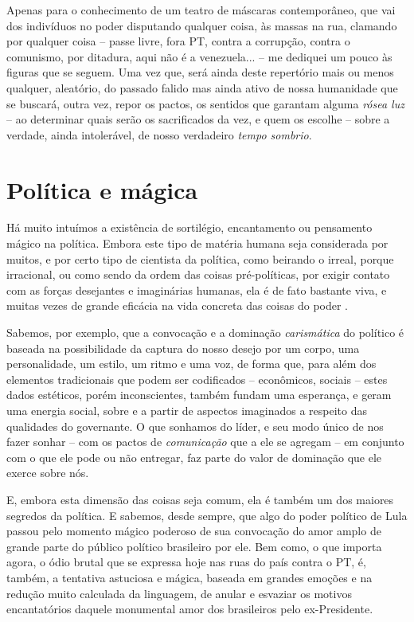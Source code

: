 Apenas para o conhecimento de um teatro de máscaras contemporâneo, que
vai dos indivíduos no poder disputando qualquer coisa, às massas na rua,
clamando por qualquer coisa -- passe livre, fora PT, contra a corrupção,
contra o comunismo, por ditadura, aqui não é a venezuela... -- me
dediquei um pouco às figuras que se seguem. Uma vez que, será ainda
deste repertório mais ou menos qualquer, aleatório, do passado falido
mas ainda ativo de nossa humanidade que se buscará, outra vez, repor os
pactos, os sentidos que garantam alguma \emph{rósea luz} -- ao
determinar quais serão os sacrificados da vez, e quem os escolhe --
sobre a verdade, ainda intolerável, de nosso verdadeiro \emph{tempo
sombrio}.

\chapter{Política e mágica}\label{poluxedtica-e-muxe1gica}

Há muito intuímos a existência de sortilégio, encantamento ou pensamento
mágico na política. Embora este tipo de matéria humana seja considerada
por muitos, e por certo tipo de cientista da política, como beirando o
irreal, porque irracional, ou como sendo da ordem das coisas
pré-políticas, por exigir contato com as forças desejantes e imaginárias
humanas, ela é de fato bastante viva, e muitas vezes de grande eficácia
na vida concreta das coisas do poder .

Sabemos, por exemplo, que a convocação e a dominação \emph{carismática}
do político é baseada na possibilidade da captura do nosso desejo por um
corpo, uma personalidade, um estilo, um ritmo e uma voz, de forma que,
para além dos elementos tradicionais que podem ser codificados --
econômicos, sociais -- estes dados estéticos, porém inconscientes,
também fundam uma esperança, e geram uma energia social, sobre e a
partir de aspectos imaginados a respeito das qualidades do governante. O
que sonhamos do líder, e seu modo único de nos fazer sonhar -- com os
pactos de \emph{comunicação} que a ele se agregam -- em conjunto com o
que ele pode ou não entregar, faz parte do valor de dominação que ele
exerce sobre nós.

E, embora esta dimensão das coisas seja comum, ela é também um dos
maiores segredos da política. E sabemos, desde sempre, que algo do poder
político de Lula passou pelo momento mágico poderoso de sua convocação
do amor amplo de grande parte do público político brasileiro por ele.
Bem como, o que importa agora, o ódio brutal que se expressa hoje nas
ruas do país contra o PT, é, também, a tentativa astuciosa e mágica,
baseada em grandes emoções e na redução muito calculada da linguagem, de
anular e esvaziar os motivos encantatórios daquele monumental amor dos
brasileiros pelo ex-Presidente.

